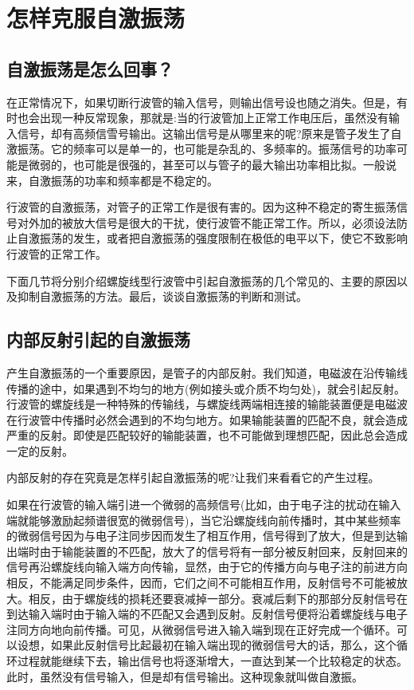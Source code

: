 \chapter{怎样克服自激振荡}\label{ch5}
\section{自激振荡是怎么回事？}
在正常情况下，如果切断行波管的输入信号，则输出信号设也随之消失。但是，有时也会出现一种反常现象，那就是:当的行波管加上正常工作电压后，虽然没有输入信号，却有高频信雪号输出。这输出信号是从哪里来的呢?原来是管子发生了自激振荡。它的频率可以是单一的，也可能是杂乱的、多频率的。振荡信号的功率可能是微弱的，也可能是很强的，甚至可以与管子的最大输出功率相比拟。一般说来，自激振荡的功率和频率都是不稳定的。


行波管的自激振荡，对管子的正常工作是很有害的。因为这种不稳定的寄生振荡信号对外加的被放大信号是很大的干扰，使行波管不能正常工作。所以，必须设法防止自激振荡的发生，或者把自激振荡的强度限制在极低的电平以下，使它不致影响行波管的正常工作。


下面几节将分别介绍螺旋线型行波管中引起自激振荡的几个常见的、主要的原因以及抑制自激振荡的方法。最后，谈谈自激振荡的判断和测试。


\section{内部反射引起的自激振荡}
产生自激振荡的一个重要原因，是管子的内部反射。我们知道，电磁波在沿传输线传播的途中，如果遇到不均匀的地方(例如接头或介质不均匀处)，就会引起反射。行波管的螺旋线是一种特殊的传输线，与螺旋线两端相连接的输能装置便是电磁波在行波管中传播时必然会遇到的不均匀地方。如果输能装置的匹配不良，就会造成严重的反射。即使是匹配较好的输能装置，也不可能做到理想匹配，因此总会造成一定的反射。


内部反射的存在究竟是怎样引起自激振荡的呢?让我们来看看它的产生过程。


如果在行波管的输入端引进一个微弱的高频信号(比如，由于电子注的扰动在输入端就能够激励起频谱很宽的微弱信号)，当它沿螺旋线向前传播时，其中某些频率的微弱信号因为与电子注同步因而发生了相互作用，信号得到了放大，但是到达输出端时由于输能装置的不匹配，放大了的信号将有一部分被反射回来，反射回来的信号再沿螺旋线向输入端方向传输，显然，由于它的传播方向与电子注的前进方向相反，不能满足同步条件，因而，它们之间不可能相互作用，反射信号不可能被放大。相反，由于螺旋线的损耗还要衰减掉一部分。衰减后剩下的那部分反射信号在到达输入端时由于输入端的不匹配又会遇到反射。反射信号便将沿着螺旋线与电子注同方向地向前传播。可见，从微弱信号进入输入端到现在正好完成一个循环。可以设想，如果此反射信号比起最初在输入端出现的微弱信号大的话，那么，这个循环过程就能继续下去，输出信号也将逐渐增大，一直达到某一个比较稳定的状态。此时，虽然没有信号输入，但是却有信号输出。这种现象就叫做自激振。

